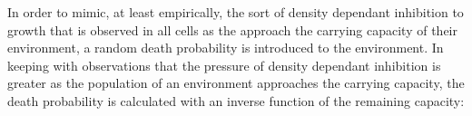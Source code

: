 In order to mimic, at least empirically, the sort of density dependant inhibition to growth that is observed in all cells as the approach the carrying capacity of their environment, a random death probability is introduced to the environment. In keeping with observations that the pressure of density dependant inhibition is greater as the population of an environment approaches the carrying capacity, the death probability is calculated with an inverse function of the remaining capacity:


